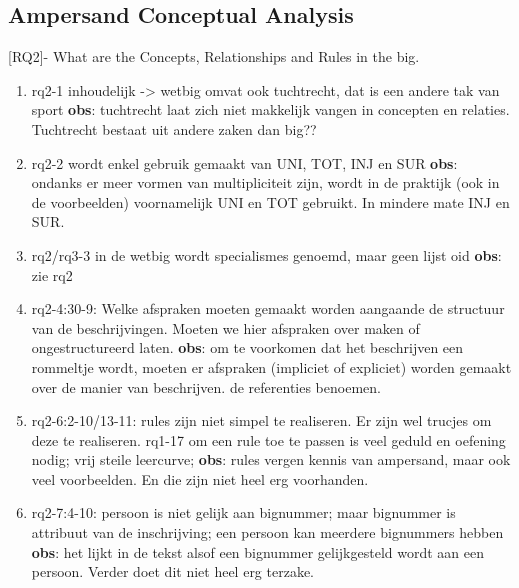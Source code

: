 \subsection{Ampersand Conceptual Analysis}
[RQ2]- What are the Concepts, Relationships and Rules in the \acrshort{big}.
\begin{enumerate}
    \item rq2-1 inhoudelijk -> wetbig omvat ook tuchtrecht, dat is een andere tak van sport
    \newline\textbf{obs}: tuchtrecht laat zich niet makkelijk vangen in concepten en relaties. 
    Tuchtrecht bestaat uit andere zaken dan big??
     
    \item rq2-2 wordt enkel gebruik gemaakt van UNI, TOT, INJ en SUR
    \newline\textbf{obs}: ondanks er meer vormen van multipliciteit zijn, wordt in de praktijk (ook in de voorbeelden) voornamelijk UNI en TOT gebruikt. In mindere mate INJ en SUR. 
     
    \item rq2/rq3-3 in de wetbig wordt specialismes genoemd, maar geen lijst oid
    \newline\textbf{obs}: zie rq2
     
    \item rq2-4:30-9: Welke afspraken moeten gemaakt worden aangaande de structuur van de beschrijvingen. 
    Moeten we hier afspraken over maken of ongestructureerd laten.
    \newline\textbf{obs}: om te voorkomen dat het beschrijven een rommeltje wordt, moeten er afspraken (impliciet of expliciet) worden gemaakt over de manier van beschrijven. 
    de referenties benoemen.
    
    \item rq2-6:2-10/13-11: rules zijn niet simpel te realiseren. Er zijn wel trucjes om deze te realiseren.
    \newline rq1-17 om een rule toe te passen is veel geduld en oefening nodig; vrij steile leercurve; 
    \newline\textbf{obs}: rules vergen kennis van ampersand, maar ook veel voorbeelden. En die zijn niet heel erg voorhanden.
    
    \item rq2-7:4-10: persoon is niet gelijk aan bignummer; maar bignummer is attribuut van de inschrijving; een persoon kan meerdere bignummers hebben
    \newline\textbf{obs}: het lijkt in de tekst alsof een bignummer gelijkgesteld wordt aan een persoon. Verder doet dit niet heel erg terzake.
    

\end{enumerate}
